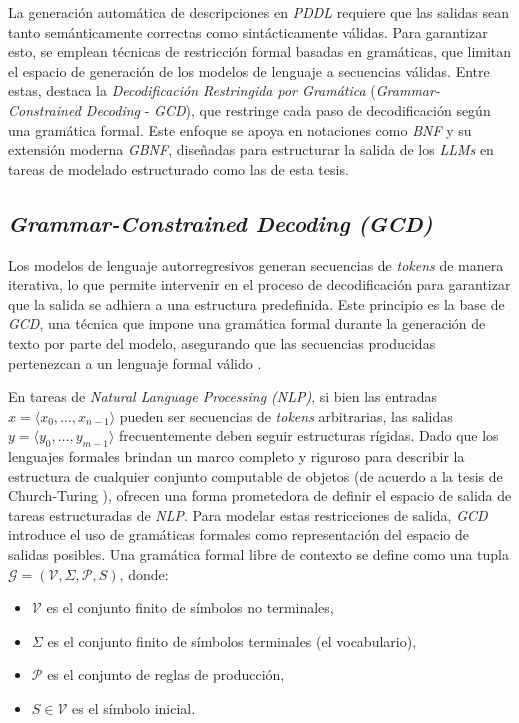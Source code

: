 La generación automática de descripciones en \textit{PDDL} requiere que las salidas sean tanto semánticamente correctas como sintácticamente válidas. Para garantizar esto, se emplean técnicas de restricción formal basadas en gramáticas, que limitan el espacio de generación de los modelos de lenguaje a secuencias válidas. Entre estas, destaca la \textit{Decodificación Restringida por Gramática} (\textit{Grammar-Constrained Decoding} - \textit{GCD}), que restringe cada paso de decodificación según una gramática formal. Este enfoque se apoya en notaciones como \textit{BNF} y su extensión moderna \textit{GBNF}, diseñadas para estructurar la salida de los \textit{LLMs} en tareas de modelado estructurado como las de esta tesis.

\subsection{\textit{Grammar-Constrained Decoding (GCD)}}

Los modelos de lenguaje autorregresivos generan secuencias de \textit{tokens} de manera iterativa, lo que permite intervenir en el proceso de decodificación para garantizar que la salida se adhiera a una estructura predefinida. Este principio es la base de \textit{GCD}, una técnica que impone una gramática formal durante la generación de texto por parte del modelo, asegurando que las secuencias producidas pertenezcan a un lenguaje formal válido \parencite{geng2023grammar}.

En tareas de \textit{Natural Language Processing (NLP)}, si bien las entradas $x = \langle x_0, \dots, x_{n-1} \rangle$ pueden ser secuencias de \textit{tokens} arbitrarias, las salidas $y = \langle y_0, \dots, y_{m-1} \rangle$ frecuentemente deben seguir estructuras rígidas. Dado que los lenguajes formales brindan un marco completo y riguroso para describir la estructura de cualquier conjunto computable de objetos (de acuerdo a la tesis de Church-Turing \parencite{church1936unsolvable, turing1936computable}), ofrecen una forma prometedora de definir el espacio de salida de tareas estructuradas de \textit{NLP}. Para modelar estas restricciones de salida, \textit{GCD} introduce el uso de gramáticas formales como representación del espacio de salidas posibles. Una gramática formal libre de contexto se define como una tupla $\mathcal{G} = (\mathcal{V}, \Sigma, \mathcal{P}, S)$, donde:

\begin{itemize}
    \item $\mathcal{V}$ es el conjunto finito de símbolos no terminales,
    \item $\Sigma$ es el conjunto finito de símbolos terminales (el vocabulario),
    \item $\mathcal{P}$ es el conjunto de reglas de producción,
    \item $S \in \mathcal{V}$ es el símbolo inicial.
\end{itemize}

